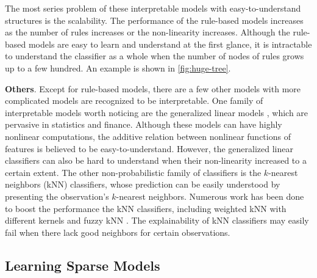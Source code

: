 The most series problem of these interpretable models with easy-to-understand structures is the scalability. The performance of the rule-based models increases as the number of rules increases or the non-linearity increases. Although the rule-based models are easy to learn and understand at the first glance, it is intractable to understand the classifier as a whole when the number of nodes of rules grows up to a few hundred. An example is shown in \autoref{fig:huge-tree}.

\textbf{Others}. Except for rule-based models, there are a few other models with more complicated models are recognized to be interpretable.
One family of interpretable models worth noticing are the generalized linear models \cite{debock2010gam}, which are pervasive in statistics and finance. Although these models can have highly nonlinear computations, the additive relation between nonlinear functions of features is believed to be easy-to-understand. However, the generalized linear classifiers can also be hard to understand when their non-linearity increased to a certain extent. The other non-probabilistic family of classifiers is the $k$-nearest neighbors (kNN) classifiers, whose prediction can be easily understood by presenting the observation's $k$-nearest neighbors. Numerous work has been done to boost the performance the kNN classifiers, including weighted kNN with different kernels \cite{dudani1976weightedknn} and fuzzy kNN \cite{keller1985fuzzyknn}. The explainability of kNN classifiers may easily fail when there lack good neighbors for certain observations.







\subsection{Learning Sparse Models}

